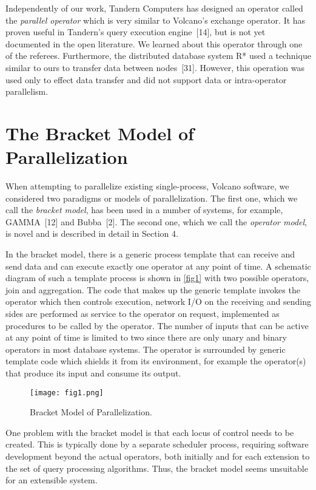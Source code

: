 \documentclass[a4paper,12pt,notitlepage,twoside,openright]{article}
\begin{document}
Independently of our work, Tandern Computers has
designed an operator called the \emph{parallel operator} which is
very similar to Volcano's exchange operator. It has proven
useful in Tandern's query execution engine~{[14]}, but is not
yet documented in the open literature. We learned about
this operator through one of the referees. Furthermore, the
distributed database system R* used a technique similar to
ours to transfer data between nodes~{[31]}. However, this
operation was used only to effect data transfer and did not
support data or intra-operator parallelism.

\section{The Bracket Model of Parallelization}

When attempting to parallelize existing single-process,
Volcano software, we considered two paradigms or models
of parallelization. The first one, which we call the \emph{bracket model},
has been used in a number of systems, for example,
GAMMA~{[12]} and Bubba~{[2]}. The second one, which we
call the \emph{operator model}, is novel and is described in detail
in Section 4.

In the bracket model, there is a generic process template
that can receive and send data and can execute
exactly one operator at any point of time. A schematic
diagram of such a template process is shown in \autoref{fig1}
with two possible operators, join and aggregation. The
code that makes up the generic template invokes the operator
which then controls execution, network I/O on the
receiving and sending sides are performed as service to the
operator on request, implemented as procedures to be called
by the operator. The number of inputs that can be active
at any point of time is limited to two since there are only
unary and binary operators in most database systems. The
operator is surrounded by generic template code which
shields it from its environment, for example the operator(s)
that produce its input and consume its output.

\begin{figure}
  \centering
  \texttt{[image: fig1.png]}
  \caption{Bracket Model of Parallelization.\label{fig1}}
\end{figure}

One problem with the bracket model is that each
locus of control needs to be created. This is typically done
by a separate scheduler process, requiring software development
beyond the actual operators, both initially and for each
extension to the set of query processing algorithms. Thus,
the bracket model seems unsuitable for an extensible system.
\end{document}

